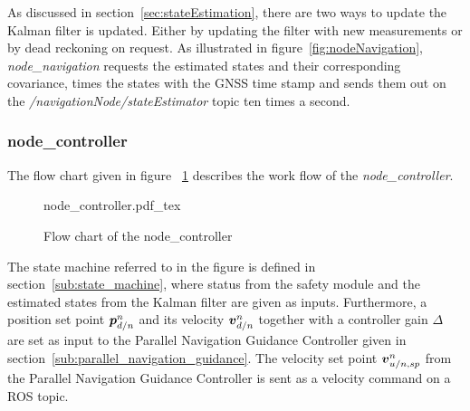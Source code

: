 As discussed in section~\ref{sec:stateEstimation}, there are two ways to update the Kalman filter is updated. Either by updating the filter with new measurements or by dead reckoning on request. As illustrated in figure~\ref{fig:nodeNavigation}, \textit{node\_navigation} requests the estimated states and their corresponding covariance, times the states with the \gls{GNSS} time stamp and sends them out on the \textit{/navigationNode/stateEstimator} topic ten times a second.


\subsubsection{node\_controller} %
\label{ssub:node_controller}
The flow chart given in figure ~\ref{fig:nodeController} describes the work flow of the \textit{node\_controller}.
\begin{figure}[ht]
    \centering
    {node_controller.pdf_tex}
    \caption{Flow chart of the node\_controller}
    \label{fig:nodeController}
\end{figure}
The state machine referred to in the figure is defined in section~\ref{sub:state_machine}, where status from the safety module and the estimated states from the Kalman filter are given as inputs. Furthermore, a position set point $\boldsymbol{p}_{d/n}^{n}$ and its velocity $\boldsymbol{v}_{d/n}^{n}$ together with a controller gain $\Delta$ are set as input to the Parallel Navigation Guidance Controller given in section~\ref{sub:parallel_navigation_guidance}. The velocity set point $\boldsymbol{v}_{u/n,sp}^{n}$ from the Parallel Navigation Guidance Controller is sent as a velocity command on a \gls{ROS} topic. 

